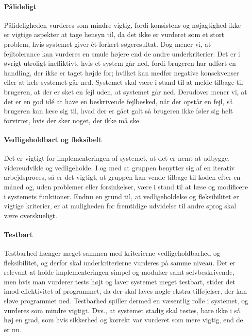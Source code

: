 \paragraph{Pålideligt} Pålideligheden vurderes som mindre vigtig, fordi konsistens og nøjagtighed ikke er vigtige aspekter at tage hensyn til, da det ikke er vurderet som et stort problem, hvis systemet giver ét forkert søgeresultat. Dog mener vi, at fejltolerance kan vurderes en smule højere end de andre underkriterier. Det er i øvrigt utroligt ineffiktivt, hvis et system går ned, fordi brugeren har udført en handling, der ikke er taget højde for; hvilket kan medfør negative konsekvenser eller at hele systemet går ned. Systemet skal være i stand til at melde tilbage til brugeren, at der er sket en fejl uden, at systemet går ned. Derudover mener vi, at det er en god idé at have en beskrivende fejlbesked, når der opstår en fejl, så brugeren kan læse sig til, hvad der er gået galt så brugeren ikke føler sig helt forvirret, hvis der sker noget, der ikke må ske.

\paragraph{Vedligeholdbart og fleksibelt} Det er vigtigt for implementeringen af systemet, at det er nemt at udbygge, videreudvikle og vedligeholde. I og med at gruppen benytter sig af en iterativ arbejdsproces, så er det vigtigt, at gruppen kan vende tilbage til koden efter \fx en måned og, uden problemer eller forsinkelser, være i stand til at læse og modificere i systemets funktioner. Endnu en grund til, at vedligeholdelse og fleksibilitet er vigtige kriterier, er at muligheden for fremtidige udvidelse til \fx andre sprog skal være overskueligt.

\paragraph{Testbart} Testbarhed hænger meget sammen med kriterierne vedligeholdbarhed og fleksibilitet, og derfor skal underkriterierne vurderes på samme niveau. Det er relevant at holde implementeringen simpel og modulær samt selvbeskrivende, men hvis man vurderer tests højt og laver systemet meget testbart, stider det imod effektivitet af programmet, da der skal laves nogle ekstra tilføjelser, der kan sløve programmet ned. Testbarhed spiller dermed en væsentlig rolle i systemet, og vurderes som mindre vigtigt. Dvs., at systemet stadig skal testes, bare ikke i så høj en grad, som hvis sikkerhed og korrekt var vurderet som mere vigtig, end de er nu.

